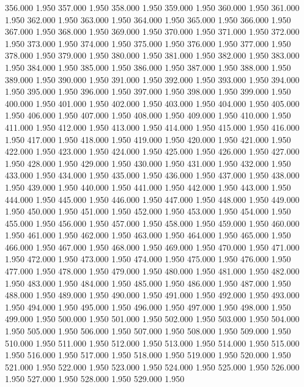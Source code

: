 356.000 1.950 
357.000 1.950 
358.000 1.950 
359.000 1.950 
360.000 1.950 
361.000 1.950 
362.000 1.950 
363.000 1.950 
364.000 1.950 
365.000 1.950 
366.000 1.950 
367.000 1.950 
368.000 1.950 
369.000 1.950 
370.000 1.950 
371.000 1.950 
372.000 1.950 
373.000 1.950 
374.000 1.950 
375.000 1.950 
376.000 1.950 
377.000 1.950 
378.000 1.950 
379.000 1.950 
380.000 1.950 
381.000 1.950 
382.000 1.950 
383.000 1.950 
384.000 1.950 
385.000 1.950 
386.000 1.950 
387.000 1.950 
388.000 1.950 
389.000 1.950 
390.000 1.950 
391.000 1.950 
392.000 1.950 
393.000 1.950 
394.000 1.950 
395.000 1.950 
396.000 1.950 
397.000 1.950 
398.000 1.950 
399.000 1.950 
400.000 1.950 
401.000 1.950 
402.000 1.950 
403.000 1.950 
404.000 1.950 
405.000 1.950 
406.000 1.950 
407.000 1.950 
408.000 1.950 
409.000 1.950 
410.000 1.950 
411.000 1.950 
412.000 1.950 
413.000 1.950 
414.000 1.950 
415.000 1.950 
416.000 1.950 
417.000 1.950 
418.000 1.950 
419.000 1.950 
420.000 1.950 
421.000 1.950 
422.000 1.950 
423.000 1.950 
424.000 1.950 
425.000 1.950 
426.000 1.950 
427.000 1.950 
428.000 1.950 
429.000 1.950 
430.000 1.950 
431.000 1.950 
432.000 1.950 
433.000 1.950 
434.000 1.950 
435.000 1.950 
436.000 1.950 
437.000 1.950 
438.000 1.950 
439.000 1.950 
440.000 1.950 
441.000 1.950 
442.000 1.950 
443.000 1.950 
444.000 1.950 
445.000 1.950 
446.000 1.950 
447.000 1.950 
448.000 1.950 
449.000 1.950 
450.000 1.950 
451.000 1.950 
452.000 1.950 
453.000 1.950 
454.000 1.950 
455.000 1.950 
456.000 1.950 
457.000 1.950 
458.000 1.950 
459.000 1.950 
460.000 1.950 
461.000 1.950 
462.000 1.950 
463.000 1.950 
464.000 1.950 
465.000 1.950 
466.000 1.950 
467.000 1.950 
468.000 1.950 
469.000 1.950 
470.000 1.950 
471.000 1.950 
472.000 1.950 
473.000 1.950 
474.000 1.950 
475.000 1.950 
476.000 1.950 
477.000 1.950 
478.000 1.950 
479.000 1.950 
480.000 1.950 
481.000 1.950 
482.000 1.950 
483.000 1.950 
484.000 1.950 
485.000 1.950 
486.000 1.950 
487.000 1.950 
488.000 1.950 
489.000 1.950 
490.000 1.950 
491.000 1.950 
492.000 1.950 
493.000 1.950 
494.000 1.950 
495.000 1.950 
496.000 1.950 
497.000 1.950 
498.000 1.950 
499.000 1.950 
500.000 1.950 
501.000 1.950 
502.000 1.950 
503.000 1.950 
504.000 1.950 
505.000 1.950 
506.000 1.950 
507.000 1.950 
508.000 1.950 
509.000 1.950 
510.000 1.950 
511.000 1.950 
512.000 1.950 
513.000 1.950 
514.000 1.950 
515.000 1.950 
516.000 1.950 
517.000 1.950 
518.000 1.950 
519.000 1.950 
520.000 1.950 
521.000 1.950 
522.000 1.950 
523.000 1.950 
524.000 1.950 
525.000 1.950 
526.000 1.950 
527.000 1.950 
528.000 1.950 
529.000 1.950 
